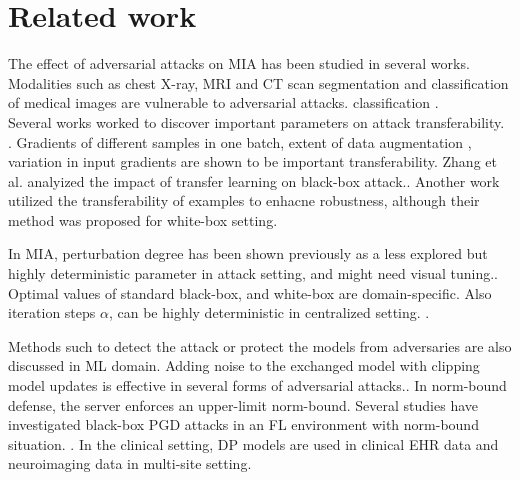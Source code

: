 \section{Related work}
\label{sec:related}


The effect of adversarial attacks on MIA has been studied in several works. Modalities such as chest X-ray, MRI \cite{finlayson2019adversarial,bortsova2021adversarial,asgari2018vulnerability,ma2021understanding} and CT scan
\cite{navarro2021evaluating}
  segmentation and classification of medical images are vulnerable to adversarial attacks. \cite{ozbulak2019impact} classification \cite{asgari2018vulnerability}.
\\Several works worked to discover important parameters on attack transferability.
\cite{gao2022boosting,elaalami2022bod,dai2021fast,duan2022novel,du2020hybrid,zheng2020efficient,shafahi2019adversarial,qiu2022framework}. Gradients of different samples in one batch\cite{shafahi2019adversarial}, extent of data augmentation \cite{gao2022boosting}, variation in input gradients \cite{qiu2022framework} are shown to be important transferability. Zhang et al. analyized the impact of transfer learning on black-box attack.\cite{zhang2020two}. Another work \cite{zheng2020efficient} utilized the transferability of examples to enhacne  robustness, although their method was proposed for white-box setting. 





In MIA,  perturbation degree
has been shown previously as a less explored but highly deterministic parameter in attack setting, and might need visual tuning.\cite{bortsova2021adversarial}. Optimal values of standard black-box\cite{bortsova2021adversarial}, and white-box \cite{ma2021understanding} are domain-specific. Also iteration steps $\alpha$, can be highly deterministic in centralized setting. \cite{tashiro2020diversity} \cite{cai2018curriculum}. 
 

 
Methods such to detect the attack
\cite{yin2021exploiting,drenkow2022attack,ma2021understanding }
or protect the models from adversaries\cite{lin2021certified,yuan2019adversarial,papernot2017practical,biggio2018wild,li2022review} are also discussed in ML domain.
 Adding noise to the exchanged model with clipping model updates is effective in several forms of adversarial attacks.\cite{bouacida2021vulnerabilities}. In norm-bound defense, the server enforces an upper-limit norm-bound. Several studies have investigated black-box PGD attacks in an FL environment with norm-bound situation. \cite{sun2019can,wang2020attack} . In the clinical setting,
\cite{shao2019stochastic} DP models are used in clinical EHR data\cite{li2019distributed}  \cite{ma2019privacy} and neuroimaging data \cite{li2020multi} in multi-site setting. 


